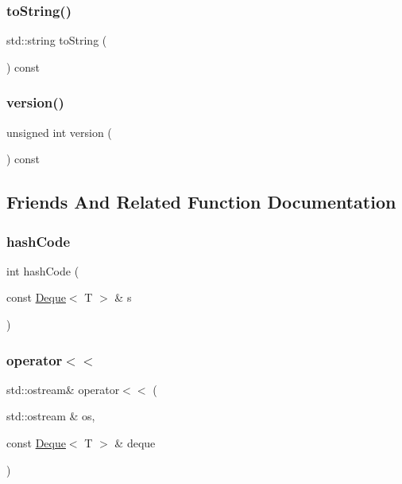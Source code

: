 \mbox{\label{classDeque_a1fe5121d6528fdea3f243321b3fa3a49}} 
\subsubsection{\texorpdfstring{to\+String()}{toString()}}
{\footnotesize\ttfamily std\+::string to\+String (\begin{DoxyParamCaption}{ }\end{DoxyParamCaption}) const}

\mbox{\label{classDeque_a0aa696ccb72cbf928535d6b646bac1aa}} 
\subsubsection{\texorpdfstring{version()}{version()}}
{\footnotesize\ttfamily unsigned int version (\begin{DoxyParamCaption}{ }\end{DoxyParamCaption}) const}



\subsection{Friends And Related Function Documentation}
\mbox{\label{classDeque_aa9e4a693df95cedc23d501cce865d9af}} 
\subsubsection{\texorpdfstring{hash\+Code}{hashCode}}
{\footnotesize\ttfamily int hash\+Code (\begin{DoxyParamCaption}\item[{const \mbox{\hyperlink{classDeque}{Deque}}$<$ T $>$ \&}]{s }\end{DoxyParamCaption})\hspace{0.3cm}{\ttfamily [friend]}}

\mbox{\label{classDeque_a369ddf8d137598b1bf09d82fbcae587c}} 
\subsubsection{\texorpdfstring{operator$<$$<$}{operator<<}}
{\footnotesize\ttfamily std\+::ostream\& operator$<$$<$ (\begin{DoxyParamCaption}\item[{std\+::ostream \&}]{os,  }\item[{const \mbox{\hyperlink{classDeque}{Deque}}$<$ T $>$ \&}]{deque }\end{DoxyParamCaption})\hspace{0.3cm}{\ttfamily [friend]}}

